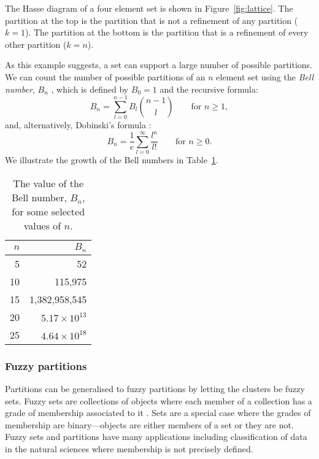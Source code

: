 \documentclass[a4paper]{report}
\begin{document}
The Hasse diagram of a four element set is shown in Figure~\ref{fig:lattice}.
The partition at the top is the partition that is not a refinement of any
partition ($k=1$).  The partition at the bottom is the partition that is a
refinement of every other partition ($k=n$).

As this example suggests, a set can support a large number of possible
partitions.  We can count the number of possible partitions of an $n$ element
set using the \textit{Bell number}, $B_n$
\citep{bell1934exponential,stanley2000enumerative}, which is defined by $B_0 =
1$ and the recursive formula:
\begin{equation*}
  B_n = \sum_{l=0}^{n-1} B_l \binom{n-1}{l} \qquad \text{for $n \geq 1$},
\end{equation*}
and, alternatively, Dobinski's formula \citep{dobinski1877summation}:
\begin{equation*}
  B_n = \frac{1}{e} \sum_{l=0}^{\infty} \frac{l^n}{l!} \qquad \text{for $n
    \geq 0$}.
\end{equation*}
We illustrate the growth of the Bell numbers in Table~\ref{tab:bell-number}.

\begin{table}
  \centering
  \begin{tabular}{rr}
    \toprule
    $n$ & $B_n$ \\
    \midrule
    5 & 52 \\
    10 & 115,975 \\
    15 & 1,382,958,545 \\
    20 & $5.17 \times 10^{13}$ \\
    25 & $4.64 \times 10^{18}$ \\
    \bottomrule
  \end{tabular}
  \caption{The value of the Bell number, $B_n$, for some selected values of
    $n$.}
  \label{tab:bell-number}
\end{table}

\subsubsection{Fuzzy partitions}
\label{sec:fuzzy-partitions}

Partitions can be generalised to fuzzy partitions by letting the clusters be
fuzzy sets.  Fuzzy sets are collections of objects where each member of a
collection has a grade of membership associated to it \citep{zadeh1965fuzzy}.
Sets are a special case where the grades of membership are binary---objects
are either members of a set or they are not.  Fuzzy sets and partitions have
many applications including classification of data in the natural sciences
where membership is not precisely defined.
\end{document}
